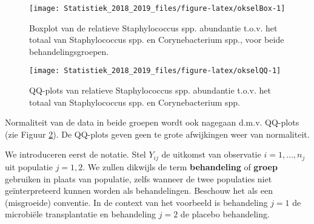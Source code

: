 \documentclass[12pt,dutch,coursenotes]{book}
\newenvironment{Shaded}{\begin{snugshade}}{\end{snugshade}}
\newcommand{\KeywordTok}[1]{\textcolor[rgb]{0.13,0.29,0.53}{\textbf{#1}}}
\newcommand{\DataTypeTok}[1]{\textcolor[rgb]{0.13,0.29,0.53}{#1}}
\newcommand{\DecValTok}[1]{\textcolor[rgb]{0.00,0.00,0.81}{#1}}
\newcommand{\StringTok}[1]{\textcolor[rgb]{0.31,0.60,0.02}{#1}}
\newcommand{\CommentTok}[1]{\textcolor[rgb]{0.56,0.35,0.01}{\textit{#1}}}
\newcommand{\ControlFlowTok}[1]{\textcolor[rgb]{0.13,0.29,0.53}{\textbf{#1}}}
\newcommand{\OperatorTok}[1]{\textcolor[rgb]{0.81,0.36,0.00}{\textbf{#1}}}
\newcommand{\NormalTok}[1]{#1}
\theoremstyle{definition}
\theoremstyle{definition}
\theoremstyle{definition}
\theoremstyle{remark}
\begin{document}
\begin{figure}

{\centering \texttt{[image: Statistiek\_2018\_2019\_files/figure-latex/okselBox-1]} 

}

\caption{Boxplot van de relatieve Staphylococcus spp. abundantie t.o.v. het totaal van Staphylococcus spp. en Corynebacterium spp., voor beide behandelingsgroepen.}\label{fig:okselBox}
\end{figure}

\begin{Shaded}
\end{Shaded}

\begin{figure}

{\centering \texttt{[image: Statistiek\_2018\_2019\_files/figure-latex/okselQQ-1]} 

}

\caption{QQ-plots van relatieve Staphylococcus spp. abundantie t.o.v. het totaal van Staphylococcus spp. en Corynebacterium spp.}\label{fig:okselQQ}
\end{figure}

Normaliteit van de data in beide groepen wordt ook nagegaan d.m.v.
QQ-plots (zie Figuur \ref{fig:okselQQ}). De QQ-plots geven geen te grote
afwijkingen weer van normaliteit.

We introduceren eerst de notatie. Stel \(Y_{ij}\) de uitkomst van
observatie \(i=1,\ldots, n_j\) uit populatie \(j=1,2\). We zullen
dikwijls de term \textbf{behandeling} of \textbf{groep} gebruiken in
plaats van populatie, zelfs wanneer de twee populaties niet
geïnterpreteerd kunnen worden als behandelingen. Beschouw het als een
(misgroeide) conventie. In de context van het voorbeeld is behandeling
\(j=1\) de microbiële transplantatie en behandeling \(j=2\) de placebo
behandeling.
\end{document}
